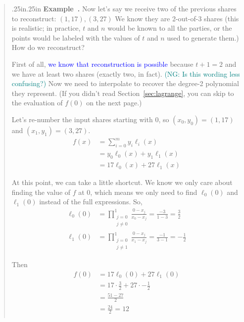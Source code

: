 \documentclass[12 pt]{article}
\newcommand{\nsm}[1]{\textcolor{teal}{(NG: #1)}}
\newcommand{\new}[1]{\textcolor{blue}{#1}}
\newcounter{example}[section]
\newenvironment{example}{\refstepcounter{example}\par\bigskip \begin{quotation}{}{\leftmargin .25in\rightmargin .25in}
    \noindent \textbf{Example~\thesection.\theexample }  \rmfamily}{\end{quotation}\par\bigskip}
\begin{document}
\begin{example}
    Now let's say we receive two of the previous shares to reconstruct:
    $(1,17),(3,27)$ We know they are 2-out-of-3 shares (this is realistic; 
    in practice, $t$ and $n$ would be known to all the parties, or the 
    points would be labeled with the values of $t$ and $n$ used to 
    generate them.) How do we reconstruct?

    First of all, \new{we know that reconstruction is possible} because 
    $t+1 = 2$ and we have at least two shares (exactly two, in fact). 
    \nsm{Is this wording less confusing?}
    Now we need to interpolate to recover the degree-2 polynomial 
    they represent. (If you didn't read Section~\ref{sec:lagrange}, 
    you can skip to the evaluation of $f(0)$ on the next page.)

    Let's re-number the input shares starting with 
    0, so $(x_0,y_0) = (1,17)$ and $(x_1,y_1) = (3,27)$.
    \begin{align*}
        f(x) &= \sum_{i=0}^{m} y_i \ell_i(x)\\
        &= y_0 \ell_0(x) + y_1 \ell_1(x)\\
        &= 17 \ell_0(x) + 27 \ell_1(x)
    \end{align*}

    At this point, we can take a little shortcut. We know we only 
    care about finding the value of $f$ at 0, which means we only 
    need to find $\ell_0(0)$ and $\ell_1(0)$ instead of the full 
    expressions. So,
    \begin{align*}
        \ell_0(0) &= \prod_{\substack{j=0\\j\neq 0}}^{1} \frac{0-x_j}{x_0-x_j}
        = \frac{-3}{1-3}
        = \frac{3}{2}\\
        \ell_1(0) &= \prod_{\substack{j=0\\j\neq 1}}^{1} \frac{0-x_j}{x_1-x_j}
        = \frac{-1}{3-1}
        = -\frac{1}{2}
    \end{align*}

    Then 
    \begin{align*}
        f(0) &= 17 \ell_0(0) + 27 \ell_1(0)\\
        &= 17 \cdot \frac{3}{2} + 27 \cdot -\frac{1}{2}\\
        &= \frac{51-27}{2}\\
        &= \frac{24}{2} = 12\\
    \end{align*}
\end{example}
\end{document}
